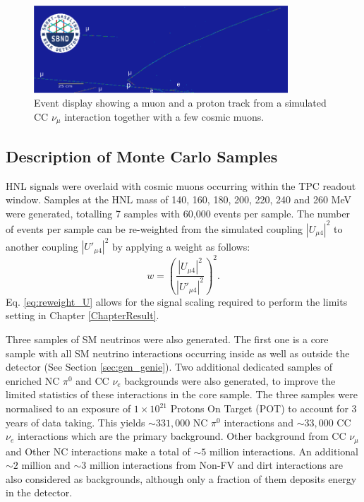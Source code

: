 \begin{figure}[hb!]
	\centering
        \includegraphics[width=0.85\textwidth]{1m1p_cos}
        \caption[Event Display of a Charged Currect Interaction Containing a Muon and a Proton]{
		Event display showing a muon and a proton track from a simulated CC $\nu_\mu$ interaction together with a few cosmic muons.
	}
	\label{fig:numu_cos_evd}
\end{figure}


\subsection{Description of Monte Carlo Samples}
\label{sec:select_mc}


HNL signals were overlaid with cosmic muons occurring within the TPC readout window.
Samples at the HNL mass of 140, 160, 180, 200, 220, 240 and 260 MeV were generated, totalling 7 samples with 60,000 events per sample.
The number of events per sample can be re-weighted from the simulated coupling $|U_{\mu4}|^{2}$ to another coupling $|U'_{\mu4}|^{2}$ by applying a weight as follows:
\begin{equation}
    w = \left(\frac{|U_{\mu4}|^{2}}{|U'_{\mu4}|^{2}}\right)^{2}.
    \label{eq:reweight_U}
\end{equation}
Eq. \ref{eq:reweight_U} allows for the signal scaling required to perform the limits setting in Chapter \ref{ChapterResult}.   

Three samples of SM neutrinos were also generated.
The first one is a core sample with all SM neutrino interactions occurring inside as well as outside the detector (See Section \ref{sec:gen_genie}).
Two additional dedicated samples of enriched NC $\pi^0$ and CC $\nu_e$ backgrounds were also generated, to improve the limited statistics of these interactions in the core sample.
The three samples were normalised to an exposure of $1 \times 10^{21}$ Protons On Target (POT) to account for 3 years of data taking.
This yields $\sim331,000$ NC $\pi^0$ interactions and $\sim33,000$ CC $\nu_e$ interactions which are the primary background.
Other background from CC $\nu_\mu$ and Other NC interactions make a total of $\sim5$ million interactions.
An additional $\sim2$ million and $\sim3$ million interactions from Non-FV and dirt interactions are also considered as backgrounds, although only a fraction of them deposits energy in the detector.

